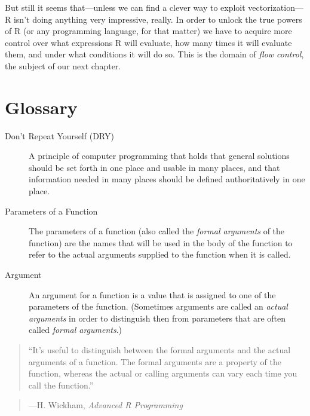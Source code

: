 \documentclass[]{book}
\theoremstyle{definition}
\theoremstyle{definition}
\theoremstyle{definition}
\theoremstyle{remark}
\begin{document}
{But still it seems that---unless we can find a clever way to exploit
vectorization---R isn't doing anything very impressive, really. In order
to unlock the true powers of R (or any programming language, for that
matter) we have to acquire more control over what expressions R will
evaluate, how many times it will evaluate them, and under what
conditions it will do so. This is the domain of \emph{flow control}, the
subject of our next chapter.

\newpage

\section*{Glossary}\label{glossary-1}

\begin{description}
\item[Don't Repeat Yourself (DRY) ]
A principle of computer programming that holds that general solutions
should be set forth in one place and usable in many places, and that
information needed in many places should be defined authoritatively in
one place.
\item[Parameters of a Function ]
The parameters of a function (also called the \emph{formal arguments} of
the function) are the names that will be used in the body of the
function to refer to the actual arguments supplied to the function when
it is called.
\item[Argument ]
An argument for a function is a value that is assigned to one of the
parameters of the function. (Sometimes arguments are called an
\emph{actual arguments} in order to distinguish then from parameters
that are often called \emph{formal arguments}.)
\end{description}

\begin{quote}
``It's useful to distinguish between the formal arguments and the actual
arguments of a function. The formal arguments are a property of the
function, whereas the actual or calling arguments can vary each time you
call the function.''
\end{quote}

\begin{quote}
---H. Wickham, \emph{Advanced R Programming}
\end{quote}

}
\end{document}
